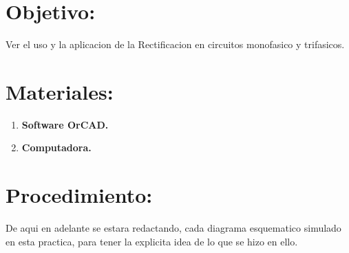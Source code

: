 \documentclass[11pt,a4paper]{article}
\begin{document}
\section{Objetivo:}
Ver el uso y la aplicacion de la Rectificacion en circuitos monofasico y trifasicos.


\section{Materiales:}
\begin{enumerate}
\item \textbf{Software OrCAD.}
\item \textbf{Computadora.}
\end{enumerate}



\section{Procedimiento:}
De aqui en adelante se estara redactando, cada diagrama esquematico simulado en esta practica, para tener la explicita idea de lo que se hizo en ello.\\
\end{document}

